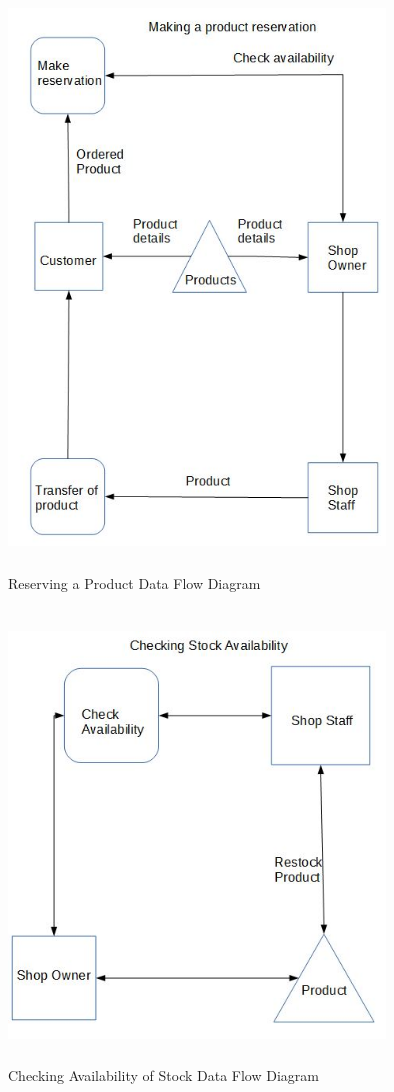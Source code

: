 \begin{figure}[H]
	\centering
	\includegraphics[width= 10cm, height = 15.5cm]{Analysis/images/reserving_dfd.JPG}
	\caption {Reserving a Product Data Flow Diagram} \label{fig:reserving_data_diagram}
\end{figure}

\begin{figure}[H]
	\centering
	\includegraphics[width= 10cm, height = 12cm]{Analysis/images/stock_check_dfd.JPG}
	\caption {Checking Availability of Stock Data Flow Diagram} \label{fig:checking_stock_data_diagram}
\end{figure}

